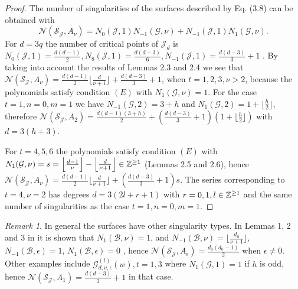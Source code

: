 \documentclass{birkjour_t2}
\theoremstyle{definition}
\theoremstyle{remark}
\numberwithin{equation}{section}
\begin{document}
 \begin{proof}
The number of singularities of the surfaces described by Eq. (3.8) can be obtained with  
$$\mathcal{N}(\mathcal{S_{J}},A_{\nu})=N_{0}(\mathcal{J},1)N_{-1}(\mathcal{G}, \nu)+N_{-1}(\mathcal{J},1)N_{1}(\mathcal{G}, \nu).$$
For $d=3q$ the number of critical points of ${\mathcal{J}}_{d}$ is $N_{0}(\mathcal{J},1)=\frac{d(d-1)}{2}, N_{8}(\mathcal{J},1)=\frac{d(d-3)}{6}, N_{-1}(\mathcal{J},1)=\frac{d(d-3)}{3}+1$ \cite{esc26}. By taking into account the results of Lemmas 2.3 and 2.4 we see  that $\mathcal{N}(\mathcal{S_{J}},A_{\nu})=\frac{d(d-1)}{2} \Big \lfloor \frac{d}{\nu+1} \Big \rfloor+\frac{d(d-3)}{3}+1$, when  $t=1,2,3, \nu > 2$, because the polynomials satisfy condition $(E)$ with $N_{1}(\mathcal{G}, \nu)=1$. For the case $t=1,n=0,m=1$ we have $N_{-1}(\mathcal{G}, 2)=3+h$ and $N_{1}(\mathcal{G}, 2)=1+\lfloor\frac{h}{2}\rfloor$, therefore
  $\mathcal{N}(\mathcal{S_{J}},A_{2})=\frac{d(d-1)(3+h)}{2}+(\frac{d(d-3)}{3}+1)(1+\lfloor\frac{h}{2}\rfloor)$ with $d=3(h+3)$.
    \par
For $t=4,5,6$ the polynomials satisfy condition $(E)$ with $N_{1}(\mathcal{G}, \nu)=s=\Big \lfloor \frac{d-1}{\nu}   \Big \rfloor-    \Big \lfloor \frac{d}{\nu+1}   \Big \rfloor  \in {\Bbb{Z}}^{\geq 1}$ (Lemmas 2.5 and 2.6), hence $\mathcal{N}(\mathcal{S_{J}}, A_{\nu})= \frac{d(d-1)}{2}  \Big \lfloor \frac{d}{\nu+1} \Big \rfloor+(\frac{d(d-3)}{3}+1)s$. The series corresponding to $t=4, \nu=2$ has degrees $d=3(2l+r+1)$ with $r=0,1, l\in {\Bbb{Z}}^{\geq 1}$ and the same number of singularities as the case $t=1,n=0,m=1$.
 
    \end{proof}
    \newtheorem*{remark}{Remark}
    \begin{remark}
    In general the surfaces have other singularity types. In Lemmas 1, 2 and 3 in \cite{esc26} it is shown that  $N_{1}(\mathcal{B}, \nu)=1$, and $N_{-1}(\mathcal{B}, \nu)=\Big \lfloor \frac{d_{0}}{\nu+1} \Big \rfloor$, $N_{-1}(\mathcal{B}, \epsilon)=1$, $N_{1}(\mathcal{B}, \epsilon)=0$ \cite{esc26}, hence  $\mathcal{N}(\mathcal{S_{J}},A_{\epsilon})=\frac{d_{0}(d_{0}-1)}{2}$ when $\epsilon \neq 0$. Other examples include ${\mathcal{G}}^{(t)}_{d,\nu,\epsilon}(w), t=1, 3$ where $N_{1}(\mathcal{G}, 1)=1$ if $h$ is odd, hence $\mathcal{N}(\mathcal{S_{J}},A_{1})=\frac{d(d-3)}{3}+1$ in that case.
        \end{remark}
 \bigskip\par
\end{document}
